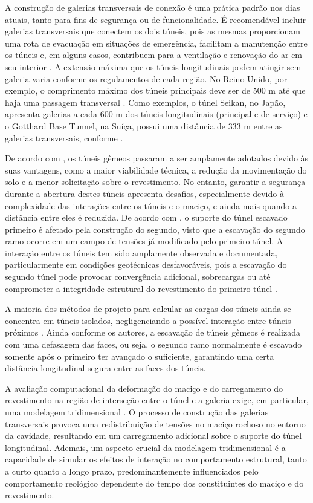 A construção de galerias transversais de conexão é uma prática padrão nos dias atuais, tanto para fins de segurança ou de funcionalidade. É recomendável incluir galerias transversais que conectem os dois túneis, pois as mesmas proporcionam uma rota de evacuação em situações de emergência, facilitam a manutenção entre os túneis e, em alguns casos, contribuem para a ventilação e renovação do ar em seu interior \cite{Dada2020}. A extensão máxima que os túneis longitudinais podem atingir sem galeria varia conforme os regulamentos de cada região. No Reino Unido, por exemplo, o comprimento máximo dos túneis principais deve ser de 500 m até que haja uma passagem transversal \cite{UKGovernment2019}. Como exemplos, o túnel Seikan, no Japão, apresenta galerias a cada 600 m dos túneis longitudinais (principal e de serviço) e o Gotthard Base Tunnel, na Suíça, possui uma distância de 333 m entre as galerias transversais, conforme .

De acordo com , os túneis gêmeos passaram a ser amplamente adotados devido às suas vantagens, como a maior viabilidade técnica, a redução da movimentação do solo e a menor solicitação sobre o revestimento. No entanto, garantir a segurança durante a abertura destes túneis apresenta desafios, especialmente devido à complexidade das interações entre os túneis e o maciço, e ainda mais quando a distância entre eles é reduzida. De acordo com , o suporte do túnel escavado primeiro é afetado pela construção do segundo, visto que a escavação do segundo ramo ocorre em um campo de tensões já modificado pelo primeiro túnel. A interação entre os túneis tem sido amplamente observada e documentada, particularmente em condições geotécnicas desfavoráveis, pois a escavação do segundo túnel pode provocar convergência adicional, sobrecargas ou até comprometer a integridade estrutural do revestimento do primeiro túnel \cite{Fortsakis2012}.

A maioria dos métodos de projeto para calcular as cargas dos túneis ainda se concentra em túneis isolados, negligenciando a possível interação entre túneis próximos \cite{ChortisKavvadas2021b}. Ainda conforme os autores, a escavação de túneis gêmeos é realizada com uma defasagem das faces, ou seja, o segundo ramo normalmente é escavado somente após o primeiro ter avançado o suficiente, garantindo uma certa distância longitudinal segura entre as faces dos túneis.

A avaliação computacional da deformação do maciço e do carregamento do revestimento na região de interseção entre o túnel e a galeria exige, em particular, uma modelagem tridimensional \cite{ChortisKavvadas2021b}. O processo de construção das galerias transversais provoca uma redistribuição de tensões no maciço rochoso no entorno da cavidade, resultando em um carregamento adicional sobre o suporte do túnel longitudinal. Ademais, um aspecto crucial da modelagem tridimensional é a capacidade de simular os efeitos de interação no comportamento estrutural, tanto a curto quanto a longo prazo, predominantemente influenciados pelo comportamento reológico dependente do tempo dos constituintes do maciço e do revestimento.

